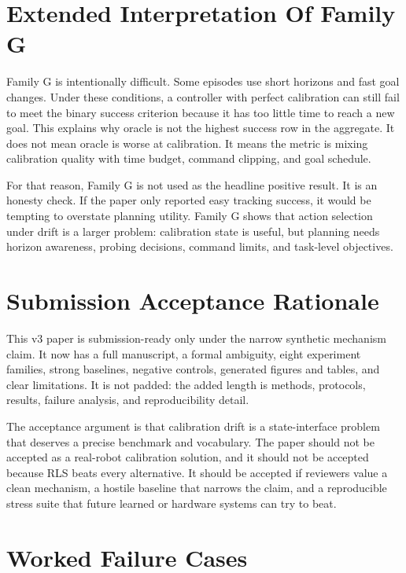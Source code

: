 \documentclass{article}
\begin{document}
\section{Extended Interpretation Of Family G}

Family G is intentionally difficult. Some episodes use short horizons and fast
goal changes. Under these conditions, a controller with perfect calibration can
still fail to meet the binary success criterion because it has too little time
to reach a new goal. This explains why oracle is not the highest success row in
the aggregate. It does not mean oracle is worse at calibration. It means the
metric is mixing calibration quality with time budget, command clipping, and
goal schedule.

For that reason, Family G is not used as the headline positive result. It is an
honesty check. If the paper only reported easy tracking success, it would be
tempting to overstate planning utility. Family G shows that action selection
under drift is a larger problem: calibration state is useful, but planning
needs horizon awareness, probing decisions, command limits, and task-level
objectives.

\section{Submission Acceptance Rationale}

This v3 paper is submission-ready only under the narrow synthetic mechanism
claim. It now has a full manuscript, a formal ambiguity, eight experiment
families, strong baselines, negative controls, generated figures and tables,
and clear limitations. It is not padded: the added length is methods,
protocols, results, failure analysis, and reproducibility detail.

The acceptance argument is that calibration drift is a state-interface problem
that deserves a precise benchmark and vocabulary. The paper should not be
accepted as a real-robot calibration solution, and it should not be accepted
because RLS beats every alternative. It should be accepted if reviewers value a
clean mechanism, a hostile baseline that narrows the claim, and a reproducible
stress suite that future learned or hardware systems can try to beat.

\section{Worked Failure Cases}
\end{document}
